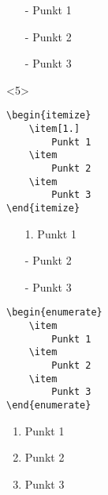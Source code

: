 \documentclass["WS\space 16-17\space -\space LaTeX-Kurs\space -\space Praesentation\space -\space 2.tex"]{subfiles}
\begin{document}
\begin{frame}[fragile]
\begin{onlyenv}
		\Ausgabe
		\begin{outputbox}
			\begin{itemize}
				\item[-]
					Punkt 1
				\item[-]
					Punkt 2
				\item[-]
					Punkt 3
			\end{itemize}
		\end{outputbox}
	\end{onlyenv}
	\begin{onlyenv}
		\Code
		\begin{lstlisting}
\begin{itemize}
	\item[1.]
		Punkt 1
	\item
		Punkt 2
	\item
		Punkt 3
\end{itemize}
		\end{lstlisting}
		
		\Ausgabe
		\begin{outputbox}
			\begin{itemize}
				\item[1.]
					Punkt 1
				\item[-]
					Punkt 2
				\item[-]
					Punkt 3
			\end{itemize}
		\end{outputbox}
	\end{onlyenv}
\end{frame}
\begin{frame}[fragile]
	\Code
	\begin{lstlisting}
\begin{enumerate}
	\item
		Punkt 1
	\item
		Punkt 2
	\item
		Punkt 3
\end{enumerate}
	\end{lstlisting}
	
	\Ausgabe
	\begin{outputbox}
		\begin{enumerate}
			\item
				Punkt 1
			\item
				Punkt 2
			\item
				Punkt 3
		\end{enumerate}
	\end{outputbox}
\end{frame}
\end{document}
